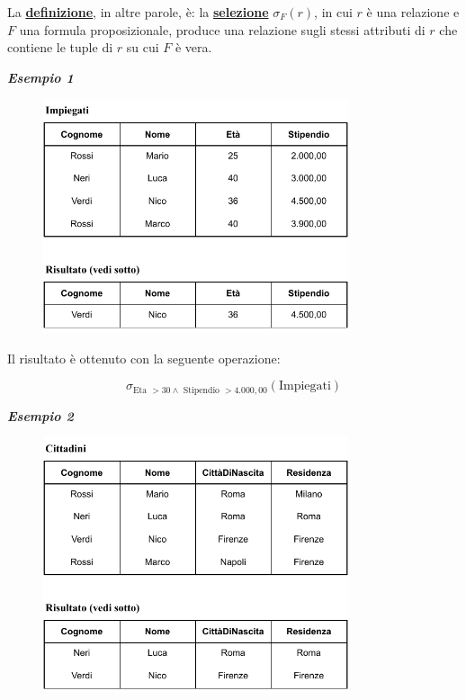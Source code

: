 \documentclass[a4paper]{article}
\begin{document}
	\noindent
	La \textbf{\underline{definizione}}, in altre parole, è: la \textcolor{Red3}{\textbf{\underline{selezione}}} $\sigma_{F}\left(r\right)$, in cui $r$ è una relazione e $F$ una formula proposizionale, produce una relazione sugli stessi attributi di $r$ che contiene le tuple di $r$ su cui $F$ è vera.
	
	\newpage
	
	\noindent
	\textcolor{Green4}{\textbf{\emph{Esempio 1}}}
	
	\begin{figure}[!htp]
		\centering
		\includegraphics[width=0.8\textwidth]{img/selezione1.pdf}
	\end{figure}

	\noindent
	Il risultato è ottenuto con la seguente operazione:
	
	\begin{equation*}
		\sigma_{\text{Eta } > 30 \land \text{ Stipendio } > 4.000,00}\left(\text{Impiegati}\right)
	\end{equation*}

	\noindent
	\textcolor{Green4}{\textbf{\emph{Esempio 2}}}
	
	\begin{figure}[!htp]
		\centering
		\includegraphics[width=0.8\textwidth]{img/selezione2.pdf}
	\end{figure}
\end{document}
